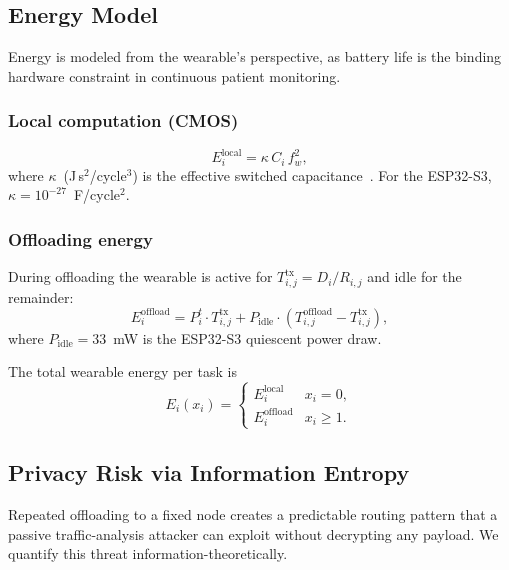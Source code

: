 \documentclass[journal]{IEEEtran}
\begin{document}
\subsection{Energy Model}
\label{subsec:energy}

Energy is modeled from the wearable's perspective, as battery life is
the binding hardware constraint in continuous patient monitoring.

\subsubsection{Local computation (CMOS)}
\begin{equation}
  E^{\mathrm{local}}_i = \kappa \, C_i \, f_w^2,
  \label{eq:energy_local}
\end{equation}
where $\kappa$~(J\,s$^2$/cycle$^3$) is the effective switched
capacitance~\cite{burd1995processor}. For the ESP32-S3,
$\kappa = 10^{-27}$~F/cycle$^2$.

\subsubsection{Offloading energy}
During offloading the wearable is active for $T^{\mathrm{tx}}_{i,j} = D_i/R_{i,j}$
and idle for the remainder:
\begin{equation}
  E^{\mathrm{offload}}_i =
    P^t_i \cdot T^{\mathrm{tx}}_{i,j}
    + P_{\mathrm{idle}} \cdot \!\left(T^{\mathrm{offload}}_{i,j} - T^{\mathrm{tx}}_{i,j}\right),
  \label{eq:energy_offload}
\end{equation}
where $P_{\mathrm{idle}} = 33$~mW is the ESP32-S3 quiescent power draw.

The total wearable energy per task is
\begin{equation}
  E_i(x_i) =
  \begin{cases}
    E^{\mathrm{local}}_i   & x_i = 0, \\[3pt]
    E^{\mathrm{offload}}_i & x_i \geq 1.
  \end{cases}
  \label{eq:energy_total}
\end{equation}

\subsection{Privacy Risk via Information Entropy}
\label{subsec:privacy}

Repeated offloading to a fixed node creates a predictable routing
pattern that a passive traffic-analysis attacker can exploit without
decrypting any payload. We quantify this threat
information-theoretically.
\end{document}
